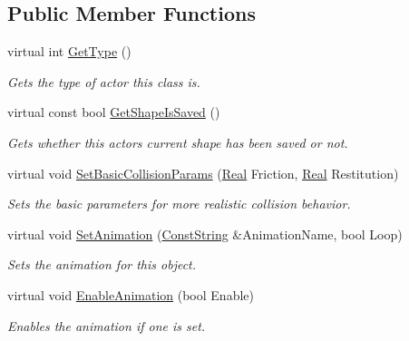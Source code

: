 \subsection*{Public Member Functions}
\begin{DoxyCompactItemize}
\item 
virtual int \hyperlink{classphys_1_1ActorBase_ab8bedea2ef0ce9194731ebeb886333ff}{GetType} ()
\begin{DoxyCompactList}\small\item\em Gets the type of actor this class is. \item\end{DoxyCompactList}\item 
virtual const bool \hyperlink{classphys_1_1ActorBase_ace1d04b4fbb21823cde3feee83d17c2f}{GetShapeIsSaved} ()
\begin{DoxyCompactList}\small\item\em Gets whether this actors current shape has been saved or not. \item\end{DoxyCompactList}\item 
virtual void \hyperlink{classphys_1_1ActorBase_ac60e1ebd1a08882234a6d04aff745260}{SetBasicCollisionParams} (\hyperlink{namespacephys_af7eb897198d265b8e868f45240230d5f}{Real} Friction, \hyperlink{namespacephys_af7eb897198d265b8e868f45240230d5f}{Real} Restitution)
\begin{DoxyCompactList}\small\item\em Sets the basic parameters for more realistic collision behavior. \item\end{DoxyCompactList}\item 
virtual void \hyperlink{classphys_1_1ActorBase_a1c84866a23fdf7598462839dddae3240}{SetAnimation} (\hyperlink{namespacephys_a5ce5049f8b4bf88d6413c47b504ebb31}{ConstString} \&AnimationName, bool Loop)
\begin{DoxyCompactList}\small\item\em Sets the animation for this object. \item\end{DoxyCompactList}\item 
virtual void \hyperlink{classphys_1_1ActorBase_a72203a9c7befd1ab606ff69af4183849}{EnableAnimation} (bool Enable)
\begin{DoxyCompactList}\small\item\em Enables the animation if one is set. \item\end{DoxyCompactList}\item 

\end{DoxyCompactItemize}
